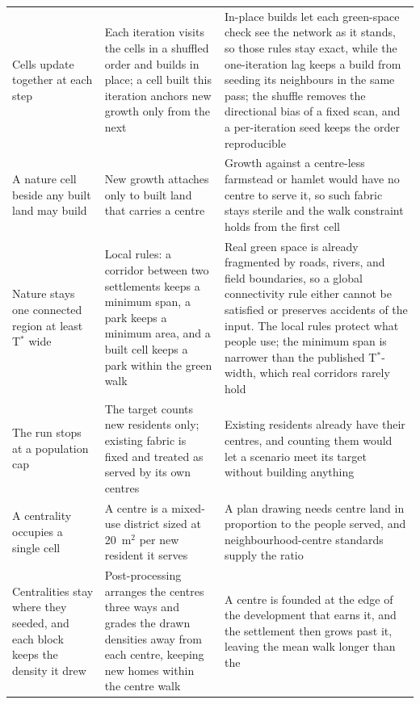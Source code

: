 \documentclass[11pt]{article}
\newcommand{\sqm}{m\(^2\)}
\begin{document}
{\begin{xltabular}{\textwidth}{L L L}
    \addlinespace[3pt]
    Cells update together at each step &
    Each iteration visits the cells in a shuffled order and builds in
    place; a cell built this iteration anchors new growth only from the
    next &
    In-place builds let each green-space check see the network as it
    stands, so those rules stay exact, while the one-iteration lag keeps a
    build from seeding its neighbours in the same pass; the shuffle removes
    the directional bias of a fixed scan, and a per-iteration seed keeps
    the order reproducible \\
    \addlinespace[3pt]
    A nature cell beside any built land may build &
    New growth attaches only to built land that carries a centre &
    Growth against a centre-less farmstead or hamlet would have no centre to
    serve it, so such fabric stays sterile and the walk constraint holds
    from the first cell \\
    \addlinespace[3pt]
    Nature stays one connected region at least T\(^*\) wide &
    Local rules: a corridor between two settlements keeps a minimum span, a
    park keeps a minimum area, and a built cell keeps a park within the
    green walk &
    Real green space is already fragmented by roads, rivers, and field
    boundaries, so a global connectivity rule either cannot be satisfied or
    preserves accidents of the input. The local rules protect what people
    use; the minimum span is narrower than the published T\(^*\)-width,
    which real corridors rarely hold \\
    \addlinespace[3pt]
    The run stops at a population cap &
    The target counts new residents only; existing fabric is fixed and
    treated as served by its own centres &
    Existing residents already have their centres, and counting them would
    let a scenario meet its target without building anything \\
    \addlinespace[3pt]
    A centrality occupies a single cell &
    A centre is a mixed-use district sized at 20~\sqm{} per new resident it
    serves &
    A plan drawing needs centre land in proportion to the people served, and
    neighbourhood-centre standards supply the ratio \\
    \addlinespace[3pt]
    Centralities stay where they seeded, and each block keeps the density it
    drew &
    Post-processing arranges the centres three ways and grades the drawn
    densities away from each centre, keeping new homes within the
    centre walk &
    A centre is founded at the edge of the development that earns it, and the
    settlement then grows past it, leaving the mean walk longer than the

\end{xltabular}}
\end{document}
